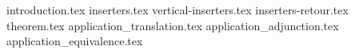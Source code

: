 \documentclass[acmsmall,anonymous,screen,review]{acmart}
\theoremstyle{acmdefinition}
\begin{document}



\maketitle


{introduction.tex}
{inserters.tex}
{vertical-inserters.tex}
{inserters-retour.tex}
{theorem.tex}
{application_translation.tex}
{application_adjunction.tex}
{application_equivalence.tex}
\end{document}
